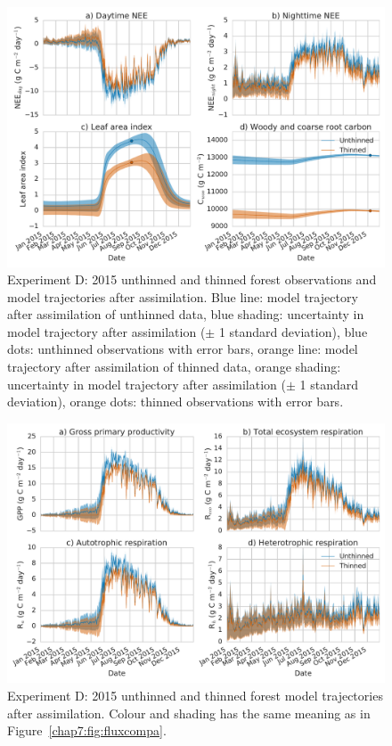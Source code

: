  
  \begin{figure}
 \noindent\includegraphics[width=30pc]{chapter/chapter7/obs_compd.pdf}
\caption{Experiment D: 2015 unthinned and thinned forest observations and model trajectories after assimilation. Blue line: model trajectory after assimilation of unthinned data, blue shading: uncertainty in model trajectory after assimilation (\(\pm\) 1 standard deviation), blue dots: unthinned observations with error bars, orange line: model trajectory after assimilation of thinned data, orange shading: uncertainty in model trajectory after assimilation (\(\pm\) 1 standard deviation), orange dots: thinned observations with error bars.}
 \label{chap7:fig:obscompd}
 \end{figure}
 
 
 \begin{figure}
 \noindent\includegraphics[width=30pc]{chapter/chapter7/flux_compd.pdf}
\caption{Experiment D: 2015 unthinned and thinned forest model trajectories after assimilation. Colour and shading has the same meaning as in Figure~\ref{chap7:fig:fluxcompa}.}
 \label{chap7:fig:fluxcompd}
 \end{figure}
 
